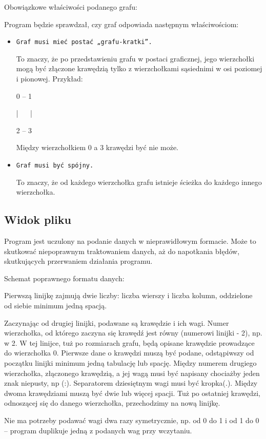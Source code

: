 \documentclass[]{article}
\begin{document}
Obowiązkowe właściwości podanego grafu:

Program będzie sprawdzał, czy graf odpowiada następnym właściwościom:
\begin{itemize}
    \item \texttt{Graf musi mieć postać „grafu-kratki”. }
    
To znaczy, że po przedstawieniu grafu w postaci graficznej, jego wierzchołki mogą być złączone krawędzią tylko z wierzchołkami sąsiednimi w osi poziomej i pionowej. Przykład:

0 – 1

|\, \, \, \,|

2 – 3  

Między wierzchołkiem 0 a 3 krawędzi być nie może.
    \item \texttt{Graf musi być spójny.}

To znaczy, że od każdego wierzchołka grafu istnieje ścieżka do każdego innego wierzchołka.

\end{itemize}

\subsection{Widok pliku}
Program jest uczulony na podanie danych w nieprawidłowym formacie. Może to skutkować niepoprawnym traktowaniem danych, aż do napotkania błędów, skutkujących przerwaniem działania programu. 

Schemat poprawnego formatu danych:

Pierwszą linijkę zajmują dwie liczby: liczba wierszy i liczba kolumn, oddzielone od siebie minimum jedną spacją.

Zaczynając od drugiej linijki, podawane są krawędzie i ich wagi. Numer wierzchołka, od którego zaczyna się krawędź jest równy (numerowi linijki - 2), np. w 2. W tej linijce, tuż po rozmiarach grafu, będą opisane krawędzie prowadzące do wierzchołka 0. Pierwsze dane o krawędzi muszą być podane, odstąpiwszy od początku linijki minimum jedną tabulację lub spację. Między numerem drugiego wierzchołka, złączonego krawędzią, a jej wagą musi być napisany chociażby jeden znak niepusty, np (:). Separatorem dziesiętnym wagi musi być kropka(.). Między dwoma krawędziami muszą być dwie lub więcej spacji. Tuż po ostatniej krawędzi, odnoszącej się do danego wierzchołka, przechodzimy na nową linijkę.

Nie ma potrzeby podawać wagi dwa razy symetrycznie, np. od 0 do 1 i od 1 do 0 – program duplikuje jedną z podanych wag przy wczytaniu.
\end{document}

